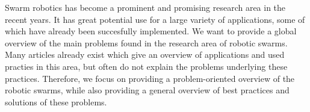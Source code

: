 



Swarm robotics has become a prominent and promising research area in the recent years. 
It has great potential use for a large variety of applications, some of which have already been succesfully implemented. 
We want to provide a global overview of the main problems found in the research area of robotic swarms. 
Many articles already exist which give an overview of applications and used practies in this area, but often do not explain the problems underlying these practices. 
Therefore, we focus on providing a problem-oriented overview of the robotic swarms, while also providing a general overview of best practices and solutions of these problems. 

